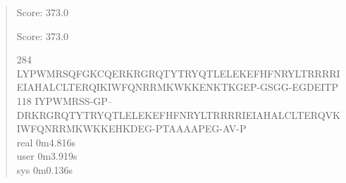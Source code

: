 \documentclass[12pt]{article}
\begin{document}
	\begin{verse}
	Score: 373.0

Score: 373.0

284 LYPWMRSQFGKCQERKRGRQTYTRYQTLELEKEFHFNRYLTRRRRIEIAHALCLTERQIKIWFQNRRMKWKKENKTKGEP-GSGG-EGDEITP \\
118 IYPWMRSS-GP--DRKRGRQTYTRYQTLELEKEFHFNRYLTRRRRIEIAHALCLTERQVKIWFQNRRMKWKKEHKDEG-PTAAAAPEG-AV-P
	\\
	real	0m4.816s \\
	user	0m3.919s \\
	sys	0m0.136s \\
	\end{verse}
\end{document}
